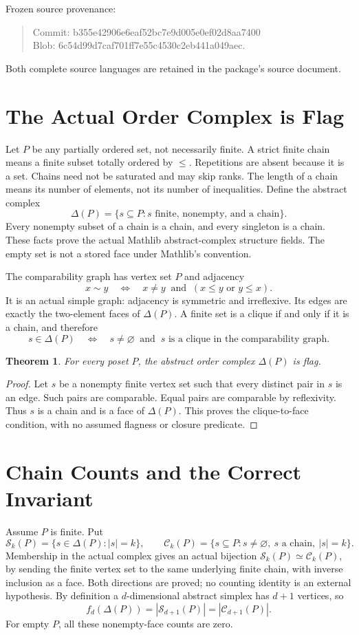 \documentclass[11pt]{article}
\newtheorem{theorem}{Theorem}
\newcommand{\D}{\Delta}
\begin{document}
Frozen source provenance:
\begin{quote}\small\ttfamily
Commit: b355e42906e6eaf52bc7e9d005e0ef02d8aa7400\\
Blob: 6c54d99d7caf701ff7e55c4530c2eb441a049aec.
\end{quote}
Both complete source languages are retained in the package's source document.

\section{The Actual Order Complex is Flag}
Let $P$ be any partially ordered set, not necessarily finite. A strict finite
chain means a finite subset totally ordered by $\le$. Repetitions are absent
because it is a set. Chains need not be saturated and may skip ranks. The
length of a chain means its number of elements, not its number of inequalities.
Define the abstract complex
\[
 \D(P)=\{s\subseteq P:s\text{ finite, nonempty, and a chain}\}.
\]
Every nonempty subset of a chain is a chain, and every singleton is a chain.
These facts prove the actual Mathlib abstract-complex structure fields.
The empty set is not a stored face under Mathlib's convention.

The comparability graph has vertex set $P$ and adjacency
\[
 x\sim y\quad\Longleftrightarrow\quad x\ne y\ \text{ and }\ (x\le y\text{ or }y\le x).
\]
It is an actual simple graph: adjacency is symmetric and irreflexive. Its
edges are exactly the two-element faces of $\D(P)$. A finite set is a clique
if and only if it is a chain, and therefore
\[
 s\in\D(P)\quad\Longleftrightarrow\quad s\ne\varnothing
       \ \text{ and }\ s\text{ is a clique in the comparability graph}.
\]

\begin{theorem}
For every poset $P$, the abstract order complex $\D(P)$ is flag.
\end{theorem}
\begin{proof}
Let $s$ be a nonempty finite vertex set such that every distinct pair in $s$
is an edge. Such pairs are comparable. Equal pairs are comparable by reflexivity.
Thus $s$ is a chain and is a face of $\D(P)$. This proves the clique-to-face
condition, with no assumed flagness or closure predicate.
\end{proof}

\section{Chain Counts and the Correct Invariant}
Assume $P$ is finite. Put
\[
 \mathcal S_k(P)=\{s\in\D(P):|s|=k\},\qquad
 \mathcal C_k(P)=\{s\subseteq P:s\ne\varnothing,\ s\text{ a chain},\ |s|=k\}.
\]
Membership in the actual complex gives an actual bijection
$\mathcal S_k(P)\simeq\mathcal C_k(P)$, by sending the finite vertex set to
the same underlying finite chain, with inverse inclusion as a face. Both
directions are proved; no counting identity is an external hypothesis.
By definition a $d$-dimensional abstract simplex has $d+1$ vertices, so
\[
 f_d(\D(P))=|\mathcal S_{d+1}(P)|=|\mathcal C_{d+1}(P)|.
\]
For empty $P$, all these nonempty-face counts are zero.
\end{document}
